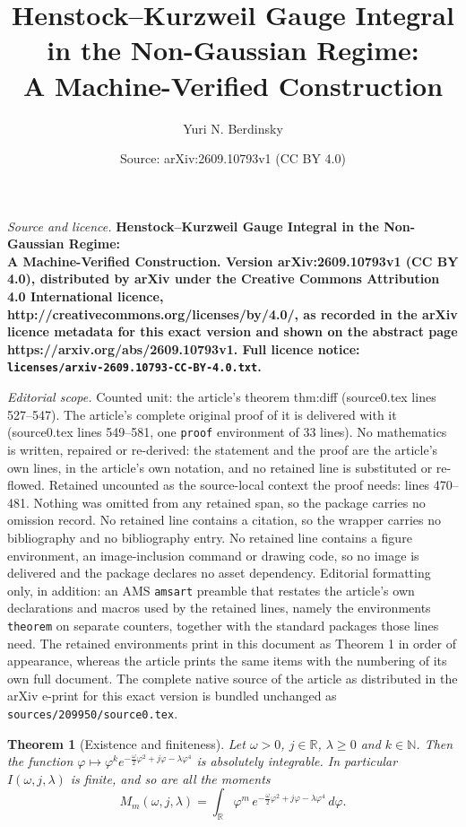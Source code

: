 \documentclass[10pt,a4paper]{amsart}
\title{\bfseries Henstock--Kurzweil Gauge Integral in the Non-Gaussian Regime:\\ A Machine-Verified Construction}
\author{Yuri N. Berdinsky}
\date{Source: arXiv:2609.10793v1 (CC BY 4.0)}
\newtheorem{theorem}{Theorem}
\newcommand{\N}{\mathbb{N}}
\newcommand{\R}{\mathbb{R}}
\begin{document}
\maketitle

\noindent\emph{Source and licence.} \bfseries Henstock--Kurzweil Gauge Integral in the Non-Gaussian Regime:\\ A Machine-Verified Construction. Version arXiv:2609.10793v1 (CC BY 4.0), distributed by arXiv under the Creative Commons Attribution 4.0 International licence, http://creativecommons.org/licenses/by/4.0/, as recorded in the arXiv licence metadata for this exact version and shown on the abstract page https://arxiv.org/abs/2609.10793v1. Full licence notice: \texttt{licenses/arxiv-2609.10793-CC-BY-4.0.txt}.\par\smallskip

\noindent\textit{Editorial scope.} Counted unit: the article's theorem thm:diff (source0.tex lines 527--547). The article's complete original proof of it is delivered with it (source0.tex lines 549--581, one \texttt{proof} environment of 33 lines). No mathematics is written, repaired or re-derived: the statement and the proof are the article's own lines, in the article's own notation, and no retained line is substituted or re-flowed.  Retained uncounted as the source-local context the proof needs: lines 470--481.  Nothing was omitted from any retained span, so the package carries no omission record.  No retained line contains a citation, so the wrapper carries no bibliography and no bibliography entry.  No retained line contains a figure environment, an image-inclusion command or drawing code, so no image is delivered and the package declares no asset dependency.  Editorial formatting only, in addition: an AMS \texttt{amsart} preamble that restates the article's own declarations and macros used by the retained lines, namely the environments \texttt{theorem} on separate counters, together with the standard packages those lines need.  The retained environments print in this document as Theorem 1 in order of appearance, whereas the article prints the same items with the numbering of its own full document.  The complete native source of the article as distributed in the arXiv e-print for this exact version is bundled unchanged as \texttt{sources/209950/source0.tex}.
\begin{theorem}[Existence and finiteness]
\label{thm:finite}
Let $\omega>0$, $j\in\R$, $\lambda\ge0$ and $k\in\N$. Then the function
$\varphi\mapsto\varphi^{k}e^{-\frac{\omega}{2}\varphi^{2}+j\varphi-\lambda\varphi^{4}}$ is
absolutely integrable. In particular $I(\omega,j,\lambda)$ is finite, and so are all the
moments
\begin{equation}
\label{eq:moments}
M_m(\omega,j,\lambda)=\int_\R \varphi^{m}\,
e^{-\frac{\omega}{2}\varphi^{2}+j\varphi-\lambda\varphi^{4}}\,d\varphi .
\end{equation}
\end{theorem}
\end{document}

